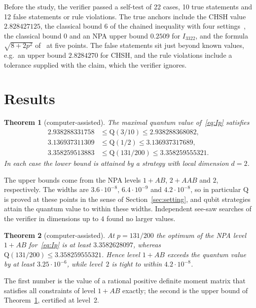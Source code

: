 \documentclass[10pt,twocolumn,a4paper]{article}
\newtheorem{theorem}{Theorem}
\theoremstyle{definition}
\theoremstyle{remark}
\newcommand{\Q}{\mathrm{Q}}
\begin{document}
Before the study, the verifier passed a self-test of 22 cases, 10 true statements and 12 false statements or rule violations.
The true anchors include the CHSH value $2.828427125$, the classical bound $6$ of the chained inequality with four
settings~\cite{bc}, the classical bound $0$ and an NPA upper bound $0.2509$ for $I_{3322}$, and the formula $\sqrt{8+2p^2}$
of~\cite{amp} at five points. The false statements sit just beyond known values, e.g.\ an upper bound $2.8284270$ for CHSH, and
the rule violations include a tolerance supplied with the claim, which the verifier ignores.

\section{Results}\label{sec:results}

\begin{theorem}[computer-assisted]\label{thm:values}
The maximal quantum value of~\eqref{eq:Ip} satisfies
\begin{align*}
2.938288331758 &\le \Q(3/10) \le 2.938288368082,\\
3.136937311309 &\le \Q(1/2) \le 3.136937317689,\\
3.358259513883 &\le \Q(131/200) \le 3.358259555321.
\end{align*}
In each case the lower bound is attained by a strategy with local dimension $d=2$.
\end{theorem}

The upper bounds come from the NPA levels $1{+}AB$, $2{+}AAB$ and $2$, respectively. The widths are $3.6\cdot10^{-8}$,
$6.4\cdot10^{-9}$ and $4.2\cdot10^{-8}$, so in particular $\Q$ is proved at these points in the sense of
Section~\ref{sec:setting}, and qubit strategies attain the quantum value to within these widths. Independent see-saw searches of
the verifier in dimensions up to $4$ found no larger values.

\begin{theorem}[computer-assisted]\label{thm:npa}
At $p=131/200$ the optimum of the NPA level $1{+}AB$ for~\eqref{eq:Ip} is at least $3.3582628097$, whereas
$\Q(131/200)\le 3.358259555321$. Hence level $1{+}AB$ exceeds the quantum value by at least $3.25\cdot10^{-6}$, while level~$2$
is tight to within $4.2\cdot10^{-8}$.
\end{theorem}

The first number is the value of a rational positive definite moment matrix that satisfies all constraints of level $1{+}AB$
exactly; the second is the upper bound of Theorem~\ref{thm:values}, certified at level~2.
\end{document}
